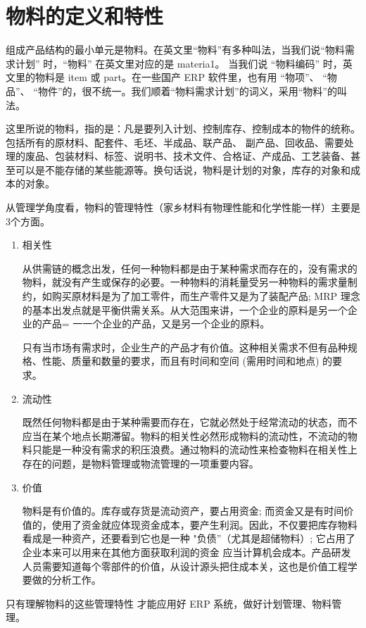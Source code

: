 \section {物料的定义和特性}

    组成产品结构的最小单元是物料。在英文里“物料”有多种叫法，当我们说“物料需求计划” 时，“物料” 在英文里对应的是 materia1。 当我们说 “物料编码” 时，英文里的物料是 item 或 part。在一些国产 ERP 软件里，也有用 “物项”、 “物品”、 “物件”的，很不统一。我们顺着“物料需求计划”的词义，采用“物料”的叫法。

    这里所说的物料，指的是：凡是要列入计划、控制库存、控制成本的物件的统称。包括所有的原材料、配套件、毛坯、半成品、联产品、 副产品、回收品、需要处理的废品、包装材料、标签、说明书、技术文件、合格证、产成品、工艺装备、甚至可以是不能存储的某些能源等。换句话说，物料是计划的对象，库存的对象和成本的对象。

    从管理学角度看，物料的管理特性（家乡材料有物理性能和化学性能一样）主要是3个方面。

    \begin{enumerate}
        \item 相关性

        从供需链的概念出发，任何一种物料都是由于某种需求而存在的，没有需求的物料，就没有产生或保存的必要。一种物料的消耗量受另一种物料的需求量制约，如购买原材料是为了加工零件，而生产零件又是为了装配产品; MRP 理念的基本出发点就是平衡供需关系。从大范围来讲，一个企业的原料是另一个企业的产品= 一一个企业的产品，又是另一个企业的原料。

        只有当市场有需求时，企业生产的产品才有价值。这种相关需求不但有品种规格、性能、质量和数量的要求，而且有时间和空间 (需用时间和地点) 的要求。

        \item 流动性

        既然任何物料都是由于某种需要而存在，它就必然处于经常流动的状态，而不应当在某个地点长期滞留。物料的相关性必然形成物料的流动性，不流动的物料只能是一种没有需求的积压浪费。通过物料的流动性来检查物料在相关性上存在的问题，是物料管理或物流管理的一项重要内容。

        \item 价值

        物料是有价值的。库存或存货是流动资产，要占用资金; 而资金又是有时间价值的，使用了资金就应体现资金成本，要产生利润。因此，不仅要把库存物料看成是一种资产，还要看到它也是一种 "负债”（尤其是超储物料）; 它占用了企业本来可以用来在其他方面获取利润的资金 应当计算机会成本。产品研发人员需要知道每个零部件的价值，从设计源头把住成本关，这也是价值工程学要做的分析工作。

    \end{enumerate}

    只有理解物料的这些管理特性 才能应用好 ERP 系统，做好计划管理、物料管理。

